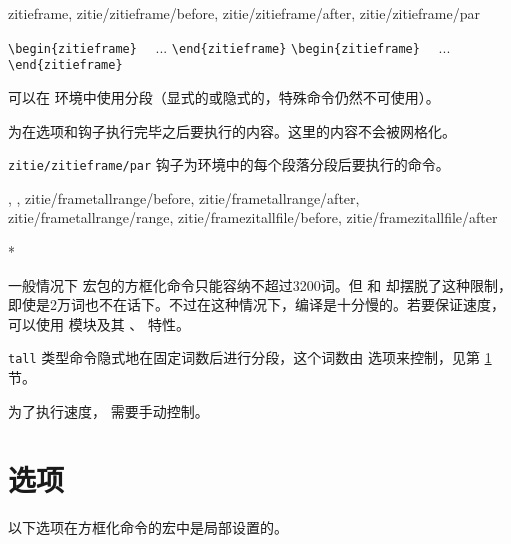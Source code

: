 \documentclass{ctxdoc}
\begin{document}
\begin{function}{zitieframe,
  zitie/zitieframe/before, zitie/zitieframe/after,
  zitie/zitieframe/par
}
  \begin{syntax}
    \verb|\begin{zitieframe}| 
    ~~...
    \verb|\end{zitieframe}|
    \verb|\begin{zitieframe}|  
    ~~...
    \verb|\end{zitieframe}|
  \end{syntax}
  可以在  环境中使用分段（显式的或隐式的，特殊命令仍然不可使用）。

   为在选项和钩子执行完毕之后要执行的内容。这里的内容不会被网格化。

  \verb|zitie/zitieframe/par| 钩子为环境中的每个段落分段后要执行的命令。
\end{function}

\begin{function}{
  \frametallrange,
  \framezitallfile,
  zitie/frametallrange/before,
  zitie/frametallrange/after,
  zitie/frametallrange/range,
  zitie/framezitallfile/before,
  zitie/framezitallfile/after
}
  \begin{syntax}
      
     *  
  \end{syntax}
  一般情况下  宏包的方框化命令只能容纳不超过3200词。但  和  却摆脱了这种限制，即使是2万词也不在话下。不过在这种情况下，编译是十分慢的。若要保证速度，可以使用  模块及其 、 特性。
\end{function}

\begin{texnote}
  \verb|tall| 类型命令隐式地在固定词数后进行分段，这个词数由  选项来控制，见第 \ref{sec:options} 节。

  为了执行速度， 需要手动控制。
\end{texnote}

\section{选项}\label{sec:options}

以下选项在方框化命令的宏中是局部设置的。
\end{document}
